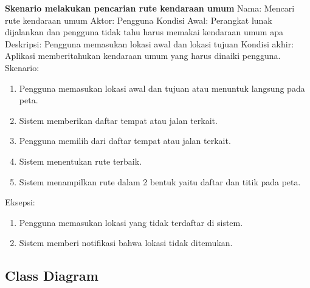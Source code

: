 \textbf{Skenario melakukan pencarian rute kendaraan umum}
Nama: Mencari rute kendaraan umum
Aktor: Pengguna
Kondisi Awal: Perangkat lunak dijalankan dan pengguna tidak tahu harus memakai kendaraan umum apa
Deskripsi: Pengguna memasukan lokasi awal dan lokasi tujuan
Kondisi akhir: Aplikasi memberitahukan kendaraan umum yang harus dinaiki pengguna.
Skenario:
\begin{enumerate}
	\item Pengguna memasukan lokasi awal dan tujuan atau menuntuk langsung pada peta.
	\item Sistem memberikan daftar tempat atau jalan terkait.
	\item Pengguna memilih dari daftar tempat atau jalan terkait.
	\item Sistem menentukan rute terbaik.
	\item Sistem menampilkan rute dalam 2 bentuk yaitu daftar dan titik pada peta.
\end{enumerate}
Eksepsi:
\begin{enumerate}
	\item Pengguna memasukan lokasi yang tidak terdaftar di sistem.
	\item Sistem memberi notifikasi bahwa lokasi tidak ditemukan.
\end{enumerate}

\subsection{Class Diagram}
\label{lab:Class Diagram}